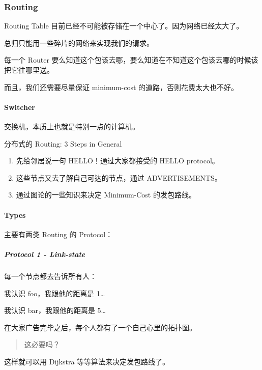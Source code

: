 \documentclass[
]{article}
\begin{document}
\hypertarget{header-n162}{%
\subsubsection{Routing}\label{header-n162}}

Routing Table 目前已经不可能被存储在一个中心了。因为网络已经太大了。

总归只能用一些碎片的网络来实现我们的请求。

每一个 Router
要么知道这个包该去哪，要么知道在不知道这个包该去哪的时候该把它往哪里送。

而且，我们还需要尽量保证 minimum-cost 的道路，否则花费太大也不好。

\hypertarget{header-n167}{%
\paragraph{Switcher}\label{header-n167}}

交换机，本质上也就是特别一点的计算机。

分布式的 Routing: 3 Steps in General

\begin{enumerate}
\def\labelenumi{\arabic{enumi}.}
\item
  先给邻居说一句 HELLO！通过大家都接受的 HELLO protocol。
\item
  这些节点又去了解自己可达的节点，通过 ADVERTISEMENTS。
\item
  通过图论的一些知识来决定 Minimum-Cost 的发包路线。
\end{enumerate}

\hypertarget{header-n177}{%
\paragraph{Types}\label{header-n177}}

主要有两类 Routing 的 Protocol：

\hypertarget{header-n179}{%
\subparagraph{Protocol 1 - Link-state}\label{header-n179}}

每一个节点都去告诉所有人：

我认识 foo，我跟他的距离是 1\ldots{}

我认识 bar，我跟他的距离是 5\ldots{}

在大家广告完毕之后，每个人都有了一个自己心里的拓扑图。

\begin{quote}
这必要吗？
\end{quote}

这样就可以用 Dijkstra 等等算法来决定发包路线了。
\end{document}
